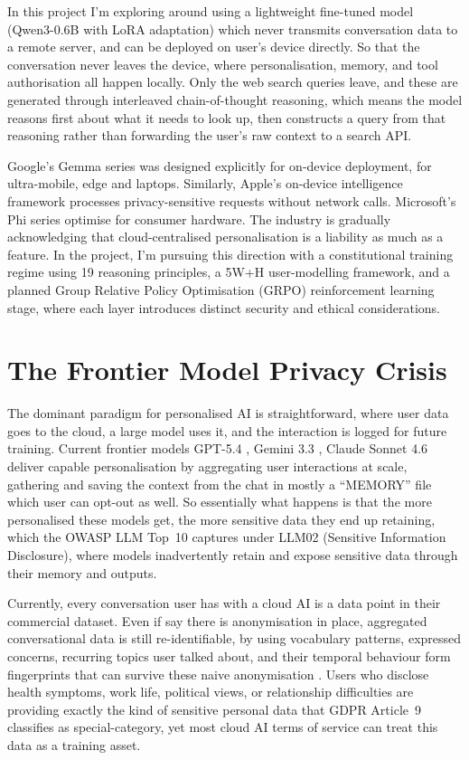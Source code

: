 \documentclass[11pt,a4paper]{article}
\begin{document}
In this project I'm exploring around using a lightweight fine-tuned model (Qwen3-0.6B \cite{qwen3} with LoRA adaptation) which never transmits conversation data to a remote server, and can be deployed on user's device directly. So that the conversation never leaves the device, where personalisation, memory, and tool authorisation all happen locally. Only the web search queries leave, and these are generated through interleaved chain-of-thought reasoning, which means the model reasons first about what it needs to look up, then constructs a query from that reasoning rather than forwarding the user's raw context to a search API.

Google's Gemma series \cite{gemma2026} was designed explicitly for on-device deployment, for ultra-mobile, edge and laptops. Similarly, Apple's on-device intelligence framework processes privacy-sensitive requests without network calls. Microsoft's Phi series \cite{phi4} optimise for consumer hardware. The industry is gradually acknowledging that cloud-centralised personalisation is a liability as much as a feature. In the project, I'm pursuing this direction with a constitutional training regime using 19 reasoning principles, a 5W+H user-modelling framework, and a planned Group Relative Policy Optimisation (GRPO) reinforcement learning stage, where each layer introduces distinct security and ethical considerations.

\section{The Frontier Model Privacy Crisis}
\label{sec:frontier}

The dominant paradigm for personalised AI is straightforward, where user data goes to the cloud, a large model uses it, and the interaction is logged for future training. Current frontier models GPT-5.4 \cite{openai2026gpt5}, Gemini 3.3 \cite{google2026gemini}, Claude Sonnet 4.6 \cite{anthropic2025claude} deliver capable personalisation by aggregating user interactions at scale, gathering and saving the context from the chat in mostly a ``MEMORY'' file which user can opt-out as well. So essentially what happens is that the more personalised these models get, the more sensitive data they end up retaining, which the OWASP LLM Top~10 \cite{owasp2025} captures under LLM02 (Sensitive Information Disclosure), where models inadvertently retain and expose sensitive data through their memory and outputs.

Currently, every conversation user has with a cloud AI is a data point in their commercial dataset. Even if say there is anonymisation in place, aggregated conversational data is still re-identifiable, by using vocabulary patterns, expressed concerns, recurring topics user talked about, and their temporal behaviour form fingerprints that can survive these naive anonymisation \cite{shokri2017}. Users who disclose health symptoms, work life, political views, or relationship difficulties are providing exactly the kind of sensitive personal data that GDPR Article~9 \cite{gdpr2016} classifies as special-category, yet most cloud AI terms of service can treat this data as a training asset.
\end{document}
